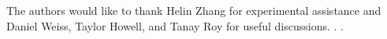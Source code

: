\begin{acknowledgments}
  The authors would like to thank Helin Zhang for experimental assistance
  and Daniel Weiss, Taylor Howell, and Tanay Roy for useful discussions. .
  .
\end{acknowledgments}
